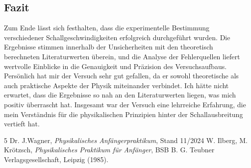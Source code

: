 \documentclass[12pt,a4paper,titlepage]{scrartcl}
\numberwithin{equation}{section}
\numberwithin{table}{section}
\numberwithin{figure}{section}
\begin{document}
\medskip
\noindent

\subsection{Fazit}
Zum Ende lässt sich festhalten, dass die experimentelle Bestimmung verschiedener Schallgeschwindigkeiten erfolgreich durchgeführt wurden. Die Ergebnisse stimmen innerhalb der Unsicherheiten mit den theoretisch berechneten Literaturwerten überein, und die Analyse der Fehlerquellen liefert wertvolle Einblicke in die Genauigkeit und Präzision des Versuchsaufbaus. Persönlich hat mir der Versuch sehr gut gefallen, da er sowohl theoretische als auch praktische Aspekte der Physik miteinander verbindet. Ich hätte nicht erwartet, dass die Ergebnisse so nah an den Literaturwerten liegen, was mich positiv überrascht hat. Insgesamt war der Versuch eine lehrreiche Erfahrung, die mein Verständnis für die physikalischen Prinzipien hinter der Schallausbreitung vertieft hat.

\clearpage

\listoffigures


\listoftables

\begin{thebibliography}{5}
     Dr. J.Wagner, \emph{Physikalisches Anfängerpraktikum}, Stand 11/2024
     W. Ilberg, M. Krötzsch, \emph{Physikalisches Praktikum für Anfänger}, BSB B. G. Teubner Verlagsgesellschaft, Leipzig (1985).
\end{thebibliography}


\appendix

\end{document}
